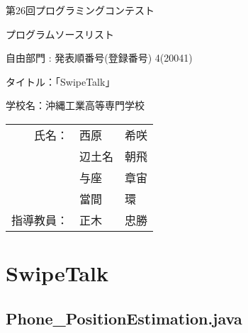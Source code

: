 \documentclass[11pt,a4j]{jarticle}
\begin{document}
\vspace*{-20mm}
{\Large

\begin{flushleft}
第26回プログラミングコンテスト
\end{flushleft}

\vspace{-15mm}
\begin{flushright}
プログラムソースリスト
\end{flushright}
}

\vspace{20mm}

\begin{center}
{\huge

{自由部門 : 発表順番号(登録番号)  4(20041)}

\vspace{20mm}
タイトル：「SwipeTalk」


\vspace{20mm}
学校名：沖縄工業高等専門学校\\

\hspace{0mm}
\vspace{0mm}

\begin{tabular}{r l l}
氏名：& 西原 & 希咲\\
	 & 辺土名 & 朝飛 \\
	 & 与座 & 章宙 \\
	 & 當間 & 環 \\
指導教員：& 正木 & 忠勝 \\
\end{tabular}
}

\end{center}


\thispagestyle{empty}
\newpage
\setcounter{page}{1}



\tableofcontents


\thispagestyle{empty}
\newpage
\setcounter{page}{1}




\section{SwipeTalk}

\subsection{Phone\_PositionEstimation.java}

\newpage


\end{document}
